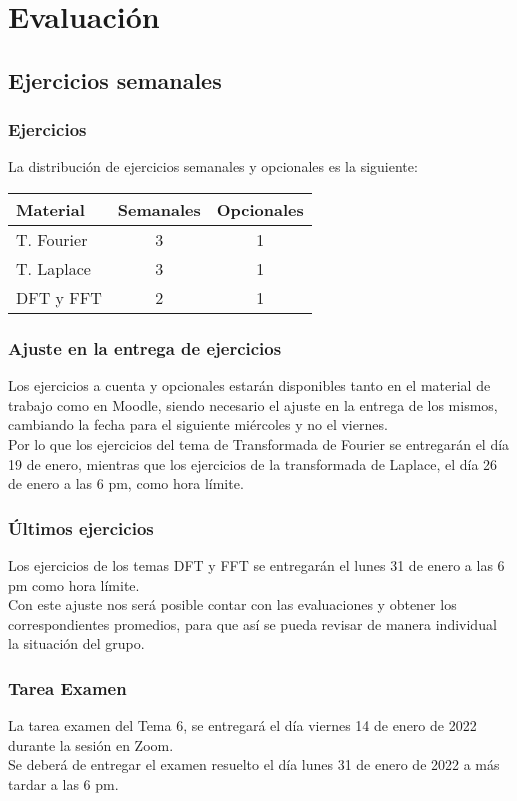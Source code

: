 \documentclass[10pt]{beamer}
\begin{document}
\section{Evaluación}
\subsection{Ejercicios semanales}

\begin{frame}
\frametitle{Ejercicios}
La distribución de ejercicios semanales y opcionales es la siguiente:
\pause
\renewcommand{\arraystretch}{1.15}
\begin{table}
\centering
\begin{tabular}{l c c}
Material & Semanales & Opcionales \\ \hline
T. Fourier & 3 & 1 \\ \hline
T. Laplace  & 3 & 1 \\ \hline
DFT y FFT & 2 & 1 \\ \hline    
\end{tabular}
\end{table}
\end{frame}
\begin{frame}
\frametitle{Ajuste en la entrega de ejercicios}
Los ejercicios a cuenta y opcionales estarán disponibles tanto en el material de trabajo como en Moodle, siendo necesario el ajuste en la entrega de los mismos, cambiando la fecha para el siguiente miércoles y no el viernes.
\\
\bigskip
\pause
Por lo que los ejercicios del tema de Transformada de Fourier se entregarán el día 19 de enero, mientras que los ejercicios de la transformada de Laplace, el día 26 de enero a las 6 pm, como hora límite. 
\end{frame}
\begin{frame}
\frametitle{Últimos ejercicios}
Los ejercicios de los temas DFT y FFT se entregarán el lunes 31 de enero a las 6 pm como hora límite.
\\
\bigskip
\pause
Con este ajuste nos será posible contar con las evaluaciones y obtener los correspondientes promedios, para que así se pueda revisar de manera individual la situación del grupo.
\end{frame}
\begin{frame}
\frametitle{Tarea Examen}
La tarea examen del Tema 6, se entregará el día viernes 14 de enero de 2022 durante la sesión en Zoom.
\\
\bigskip
\pause
Se deberá de entregar el examen resuelto el día lunes 31 de enero de 2022 a más tardar a las 6 pm.
\end{frame}
\end{document}

